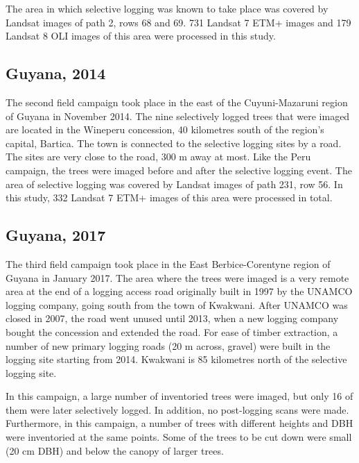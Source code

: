 \documentclass[a4paper,12pt]{scrbook}
\begin{document}
The area in which selective logging was known to take place was covered by Landsat images of path 2, rows 68 and 69. 731 Landsat 7 \ac{ETM+} images and 179 Landsat 8 \ac{OLI} images of this area were processed in this study.

\subsection{Guyana, 2014}

The second field campaign took place in the east of the Cuyuni-Mazaruni region of Guyana in November 2014. The nine selectively logged trees that were imaged are located in the Wineperu concession, 40 kilometres south of the region's capital, Bartica. The town is connected to the selective logging sites by a road. The sites are very close to the road, 300 m away at most. Like the Peru campaign, the trees were imaged before and after the selective logging event. The area of selective logging was covered by Landsat images of path 231, row 56. In this study, 332 Landsat 7 \ac{ETM+} images of this area were processed in total.


\subsection{Guyana, 2017}

The third field campaign took place in the East Berbice-Corentyne region of Guyana in January 2017. The area where the trees were imaged is a very remote area at the end of a logging access road originally built in 1997 by the UNAMCO logging company, going south from the town of Kwakwani. After UNAMCO was closed in 2007, the road went unused until 2013, when a new logging company bought the concession and extended the road. For ease of timber extraction, a number of new primary logging roads (20 m across, gravel) were built in the logging site starting from 2014. Kwakwani is 85 kilometres north of the selective logging site.

In this campaign, a large number of inventoried trees were imaged, but only 16 of them were later selectively logged. In addition, no post-logging scans were made. Furthermore, in this campaign, a number of trees with different heights and \ac{DBH} were inventoried at the same points. Some of the trees to be cut down were small (20 cm \ac{DBH}) and below the canopy of larger trees.
\end{document}
